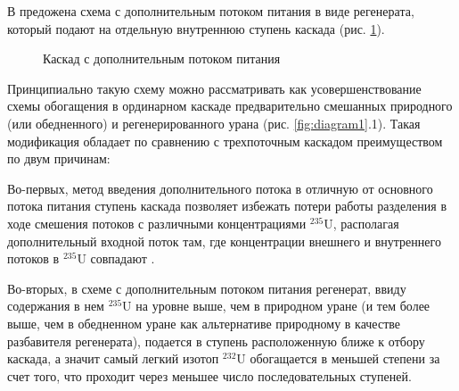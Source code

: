 В \cite{sulaberidzeQuasiidealCascadesAdditional2006} предожена схема с дополнительным потоком питания в виде регенерата, который подают на отдельную внутреннюю ступень каскада (рис. \ref{fig:2_inputs}).
\begin{figure}[ht]
  \caption{Каскад с дополнительным потоком питания}\label{fig:2_inputs}
\end{figure}

Принципиально такую схему можно рассматривать как усовершенствование схемы обогащения в ординарном каскаде предварительно смешанных природного (или обедненного) и регенерированного урана (рис. \ref{fig:diagram1}.1). Такая модификация обладает по сравнению с трехпоточным каскадом преимуществом по двум причинам:

Во-первых, метод введения дополнительного потока в отличную от основного потока питания ступень каскада позволяет избежать потери работы разделения в ходе смешения потоков с различными концентрациями $^{235}$U, располагая дополнительный входной поток там, где концентрации внешнего и внутреннего потоков в $^{235}$U совпадают \cite{smirnovKaskadnyeShemyZadachah2012, sulaberidzeQuasiidealCascadesAdditional2006}.

Во-вторых, в схеме с дополнительным потоком питания регенерат, ввиду содержания в нем $^{235}$U на уровне выше, чем в природном уране (и тем более выше, чем в обедненном уране как альтернативе природному в качестве разбавителя регенерата), подается в ступень расположенную ближе к отбору каскада, а значит самый легкий изотоп $^{232}$U обогащается в меньшей степени за счет того, что проходит через меньшее число последовательных ступеней.

